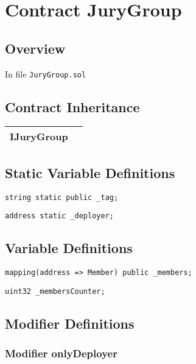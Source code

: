 
\chapter{Contract JuryGroup}

\minitoc

\section{Overview}


In file {\tt JuryGroup.sol}

\section{Contract Inheritance}


\noindent\begin{tabular}{|l|p{5cm}|}\hline
IJuryGroup & \\\hline
\end{tabular}


\section{Static Variable Definitions}

\begin{lstlisting}[firstnumber=11]
    string static public _tag;
\end{lstlisting}

\begin{lstlisting}[firstnumber=12]
    address static _deployer;
\end{lstlisting}

\section{Variable Definitions}

\begin{lstlisting}[firstnumber=14]
    mapping(address => Member) public _members;
\end{lstlisting}

\begin{lstlisting}[firstnumber=15]
    uint32 _membersCounter;
\end{lstlisting}

\section{Modifier Definitions}


\subsection{Modifier onlyDeployer}

